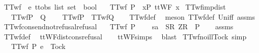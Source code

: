 \isanewline
{}\isamarkupfalse%
\ TTwf\ {\isacharcolon}{\isacharcolon}\ {\isachardoublequoteopen}{\isacharprime}e\ ttobs\ list\ set\ {\isasymRightarrow}\ bool{\isachardoublequoteclose}\ \isanewline
\ \ {\isachardoublequoteopen}TTwf\ P\ {\isacharequal}\ {\isacharparenleft}{\isasymforall}x{\isasymin}P{\isachardot}\ ttWF\ x{\isacharparenright}{\isachardoublequoteclose}\isanewline
\isanewline
{}\isamarkupfalse%
\ TTwf{\isacharunderscore}imp{\isacharunderscore}dist{\isacharcolon}\isanewline
\ \ \ {\isachardoublequoteopen}TTwf{\isacharparenleft}P\ {\isasymunion}\ Q{\isacharparenright}{\isachardoublequoteclose}\ \isanewline
\ \ \ {\isachardoublequoteopen}TTwf{\isacharparenleft}P{\isacharparenright}\ {\isasymand}\ TTwf{\isacharparenleft}Q{\isacharparenright}{\isachardoublequoteclose}\isanewline
%
\isadelimproof
\ \ %
\endisadelimproof
%
\isatagproof
{}\isamarkupfalse%
\ TTwf{\isacharunderscore}def\ \isamarkupfalse%
\ {\isacharparenleft}meson\ TTwf{\isacharunderscore}def\ Un{\isacharunderscore}iff\ assms{\isacharparenright}%
\endisatagproof
{\isafoldproof}%
%
\isadelimproof
\isanewline
%
\endisadelimproof
\isanewline
{}\isamarkupfalse%
\ TTwf{\isacharunderscore}cons{\isacharunderscore}end{\isacharunderscore}not{\isacharunderscore}refusal{\isacharunderscore}refusal{\isacharcolon}\isanewline
\ \ \ {\isachardoublequoteopen}TTwf\ P{\isachardoublequoteclose}\isanewline
\ \ \ {\isachardoublequoteopen}{\isasymnot}\ sa\ {\isacharat}\ {\isacharbrackleft}{\isacharbrackleft}S{\isacharbrackright}\isactrlsub R{\isacharcomma}\ {\isacharbrackleft}Z{\isacharbrackright}\isactrlsub R{\isacharbrackright}\ {\isasymin}\ P{\isachardoublequoteclose}\isanewline
%
\isadelimproof
\ \ %
\endisadelimproof
%
\isatagproof
{}\isamarkupfalse%
\ assms\ \isamarkupfalse%
\ TTwf{\isacharunderscore}def\ \isamarkupfalse%
\ ttWF{\isacharunderscore}dist{\isacharunderscore}cons{\isacharunderscore}refusal\isanewline
\ \ \isamarkupfalse%
\ ttWF{\isachardot}simps{\isacharparenleft}{}{}{\isacharparenright}\ \isamarkupfalse%
\ blast%
\endisatagproof
{\isafoldproof}%
%
\isadelimproof
\isanewline
%
\endisadelimproof
\isanewline
{}\isamarkupfalse%
\ TTwf{\isacharunderscore}no{\isacharunderscore}ill{\isacharunderscore}Tock\ {\isacharbrackleft}simp{\isacharbrackright}{\isacharcolon}\isanewline
\ \ \ {\isachardoublequoteopen}TTwf\ P{\isachardoublequoteclose}\ {\isachardoublequoteopen}e\ {\isasymnoteq}\ Tock{\isachardoublequoteclose}\isanewline
